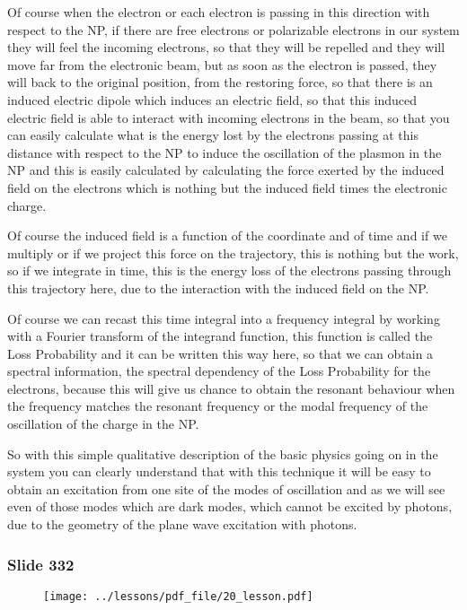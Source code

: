 \documentclass[../main/main.tex]{subfiles}
\begin{document}
Of course when the electron or each electron is passing in this direction with respect to the NP, if there are free electrons or polarizable electrons in our system they will feel the incoming electrons, so that they will be repelled and they will move far from the electronic beam, but as soon as the electron is passed, they will back to the original position, from the restoring force, so that there is an induced electric dipole which induces an electric field, so that this induced electric field is able to interact with incoming electrons in the beam, so that you can easily calculate what is the energy lost by the electrons passing at this distance with respect to the NP to induce the oscillation of the plasmon in the NP and this is easily calculated by calculating the force exerted by the induced field on the electrons which is nothing but the induced field times the electronic charge.

Of course the induced field is a function of the coordinate and of time and if we multiply or if we project this force on the trajectory, this is nothing but the work, so if we integrate in time, this is the energy loss of the electrons passing through this trajectory here, due to the interaction with the induced field on the NP.

Of course we can recast this time integral into a frequency integral by working with a Fourier transform of the integrand function, this function is called the Loss Probability and it can be written this way here, so that we can obtain a spectral information, the spectral dependency of the Loss Probability for the electrons, because this will give us chance to obtain the resonant behaviour when the frequency matches the resonant frequency or the modal frequency of the oscillation of the charge in the NP.

So with this simple qualitative description of the basic physics going on in the system you can clearly understand that with this technique it will be easy to obtain an excitation from one site of the modes of oscillation and as we will see even of those modes which are dark modes, which cannot be excited by photons, due to the geometry of the plane wave excitation with photons.

\newpage

\subsubsection{Slide 332}

\begin{figure}[h!]
\centering
\texttt{[image: ../lessons/pdf\_file/20\_lesson.pdf]}
\end{figure}
\end{document}

